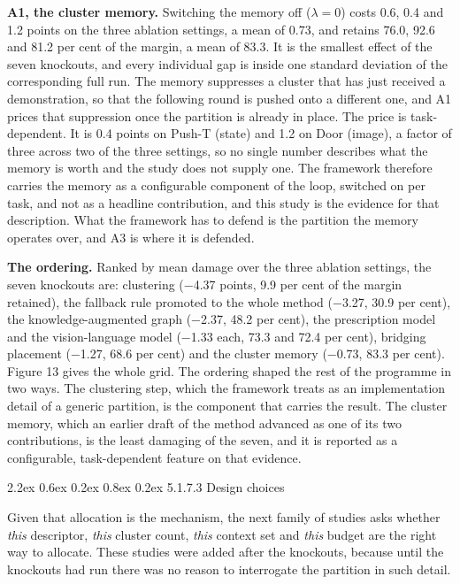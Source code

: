 \documentclass[
  11pt,
]{article}
\makeatletter
\renewcommand\paragraph{\@startsection{paragraph}{4}{\z@}%
  {2.2ex \@plus 0.6ex \@minus 0.2ex}%
  {0.8ex \@plus 0.2ex}%
  {\normalfont\normalsize\bfseries}}
\makeatother
\begin{document}
\textbf{A1, the cluster memory.} Switching the memory off
(\(\lambda = 0\)) costs 0.6, 0.4 and 1.2 points on the three ablation
settings, a mean of 0.73, and retains 76.0, 92.6 and 81.2 per cent of
the margin, a mean of 83.3. It is the smallest effect of the seven
knockouts, and every individual gap is inside one standard deviation of
the corresponding full run. The memory suppresses a cluster that has
just received a demonstration, so that the following round is pushed
onto a different one, and A1 prices that suppression once the partition
is already in place. The price is task-dependent. It is 0.4 points on
Push-T (state) and 1.2 on Door (image), a factor of three across two of
the three settings, so no single number describes what the memory is
worth and the study does not supply one. The framework therefore carries
the memory as a configurable component of the loop, switched on per
task, and not as a headline contribution, and this study is the evidence
for that description. What the framework has to defend is the partition
the memory operates over, and A3 is where it is defended.

\textbf{The ordering.} Ranked by mean damage over the three ablation
settings, the seven knockouts are: clustering (−4.37 points, 9.9 per
cent of the margin retained), the fallback rule promoted to the whole
method (−3.27, 30.9 per cent), the knowledge-augmented graph (−2.37,
48.2 per cent), the prescription model and the vision-language model
(−1.33 each, 73.3 and 72.4 per cent), bridging placement (−1.27, 68.6
per cent) and the cluster memory (−0.73, 83.3 per cent). Figure 13 gives
the whole grid. The ordering shaped the rest of the programme in two
ways. The clustering step, which the framework treats as an
implementation detail of a generic partition, is the component that
carries the result. The cluster memory, which an earlier draft of the
method advanced as one of its two contributions, is the least damaging
of the seven, and it is reported as a configurable, task-dependent
feature on that evidence.

\hypertarget{design-choices}{%
\paragraph{5.1.7.3 Design choices}\label{design-choices}}

Given that allocation is the mechanism, the next family of studies asks
whether \emph{this} descriptor, \emph{this} cluster count, \emph{this}
context set and \emph{this} budget are the right way to allocate. These
studies were added after the knockouts, because until the knockouts had
run there was no reason to interrogate the partition in such detail.
\end{document}

